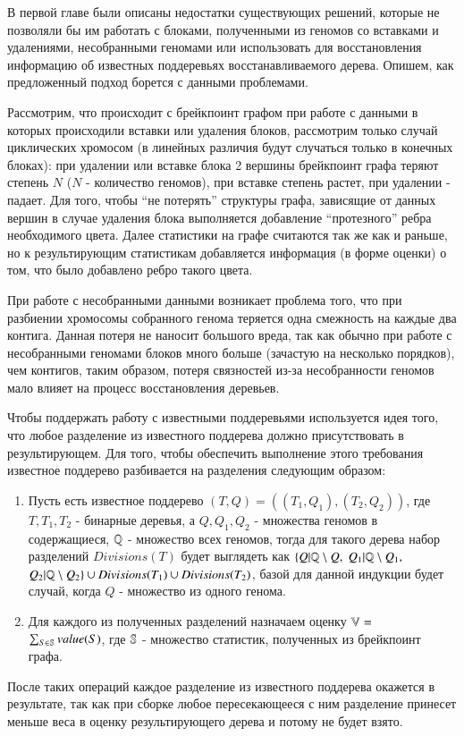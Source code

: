 В первой главе были описаны недостатки существующих решений, которые не позволяли бы им работать с блоками, полученными из геномов со вставками
и удалениями, несобранными геномами или использовать для восстановления информацию об известных поддеревьях восстанавливаемого дерева.
Опишем, как предложенный подход борется с данными проблемами.

Рассмотрим, что происходит с брейкпоинт графом при работе с данными в которых происходили вставки или удаления блоков,
рассмотрим только случай циклических хромосом (в линейных различия будут случаться только в конечных блоках):
при удалении или вставке блока 2 вершины брейкпоинт графа теряют степень $N$ ($N$ - количество геномов), при вставке степень растет,
при удалении - падает.
Для того, чтобы ``не потерять'' структуры графа, зависящие от данных вершин в случае удаления блока выполняется добавление ``протезного'' ребра
необходимого цвета.
Далее статистики на графе считаются так же как и раньше, но к результирующим статистикам добавляется информация (в форме оценки) о том,
что было добавлено ребро такого цвета.

При работе с несобранными данными возникает проблема того, что при разбиении хромосомы собранного генома теряется одна смежность на каждые
два контига.
Данная потеря не наносит большого вреда, так как обычно при работе с несобранными геномами блоков много больше (зачастую на несколько порядков),
чем контигов, таким образом, потеря связностей из-за несобранности геномов мало влияет на процесс восстановления деревьев.

Чтобы поддержать работу с известными поддеревьями используется идея того, что любое разделение из известного поддерева должно присутствовать в результирующем.
Для того, чтобы обеспечить выполнение этого требования известное поддерево разбивается на разделения следующим образом:
\begin{enumerate}
  \item Пусть есть известное поддерево $(T, Q) = ((T_1, Q_1), (T_2, Q_2))$, где $T, T_1, T_2$ - бинарные деревья,
    а $Q, Q_1, Q_2$ - множества геномов в содержащиеся, $\mathbb{Q}$ - множество всех геномов,
    тогда для такого дерева набор разделений $Divisions(T)$ будет выглядеть как
    $\{Q|\mathbb{Q} \setminus  Q,$ $Q_1|\mathbb{Q} \setminus Q_1,$ $Q_2|\mathbb{Q} \setminus Q_2\} \cup Divisions(T_1) \cup Divisions(T_2)$,
    базой для данной индукции будет случай, когда $Q$ - множество из одного генома.
  \item Для каждого из полученных разделений назначаем оценку $\mathbb{V}=$ \\
    $\sum\nolimits_{S \in \mathbb{S}} value(S)$, где $\mathbb{S}$ - множество статистик, полученных из брейкпоинт графа.
\end{enumerate}
После таких операций каждое разделение из известного поддерева окажется в результате, так как при сборке любое пересекающееся с ним разделение
принесет меньше веса в оценку результирующего дерева и потому не будет взято.
